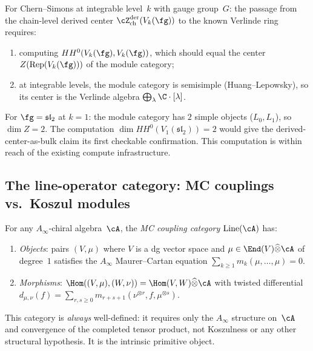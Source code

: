 \begin{remark}
\label{rem:checkable-bulk-computation}
For Chern--Simons at integrable level~$k$ with gauge group~$G$:
the passage from the chain-level derived center
$\cZ^{\mathrm{der}}_{\mathrm{ch}}(V_k(\fg))$ to the known
Verlinde ring requires:
\begin{enumerate}[label=\textup{(\roman*)}]
\item computing $HH^0(V_k(\fg), V_k(\fg))$, which should equal
 the center $Z(\operatorname{Rep}(V_k(\fg)))$ of the
 module category;
\item at integrable levels, the module category is semisimple
 (Huang--Lepowsky), so its center is the Verlinde algebra
 $\bigoplus_\lambda \C \cdot [\lambda]$.
\end{enumerate}
For $\fg = \mathfrak{sl}_2$ at $k = 1$: the module category has
$2$ simple objects ($L_0, L_1$), so $\dim Z = 2$. The
computation $\dim HH^0(V_1(\mathfrak{sl}_2)) = 2$ would give
the derived-center-as-bulk claim its first checkable confirmation.
This computation is within reach of the existing compute
infrastructure.
\end{remark}

\subsection{The line-operator category: MC couplings vs.\ Koszul
 modules}
\label{subsec:line-mc-vs-koszul}

\begin{definition}
\label{def:mc-coupling-category}
For any $A_\infty$-chiral algebra~$\cA$, the \emph{MC coupling
category} $\operatorname{Line}(\cA)$ has:
\begin{enumerate}[label=\textup{(\alph*)}]
\item \emph{Objects}: pairs $(V, \mu)$ where $V$ is a dg vector
 space and $\mu \in \End(V) \widehat\otimes \cA$ of degree~$1$
 satisfies the $A_\infty$ Maurer--Cartan equation
 $\sum_{k \ge 1} m_k(\mu, \ldots, \mu) = 0$.

\item \emph{Morphisms}:
 $\Hom((V,\mu), (W,\nu))
 = \Hom(V, W) \widehat\otimes \cA$
 with twisted differential
 $d_{\mu,\nu}(f)
 = \sum_{r,s \ge 0} m_{r+s+1}(\nu^{\otimes r}, f,
 \mu^{\otimes s})$.
\end{enumerate}
This category is \emph{always} well-defined: it requires only the
$A_\infty$ structure on~$\cA$ and convergence of the completed
tensor product, not Koszulness or any other structural hypothesis.
It is the intrinsic primitive object.
\end{definition}

